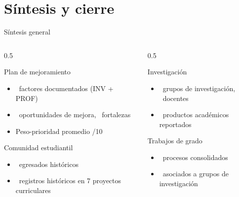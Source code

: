 \documentclass[aspectratio=169, 11pt]{beamer}
\begin{document}
\section{Síntesis y cierre}

\begin{frame}{Síntesis general}
  \begin{columns}[T]
    \begin{column}{0.5\textwidth}
      \begin{block}{Plan de mejoramiento}
        \begin{itemize}
          \small
          \item \NumFactoresTotal\ factores documentados (INV + PROF)
          \item \NumOportunidades\ oportunidades de mejora, \NumFortalezas\ fortalezas
          \item Peso-prioridad promedio \PesoPromInv/10
        \end{itemize}
      \end{block}
      \begin{block}{Comunidad estudiantil}
        \begin{itemize}
          \small
          \item \TotalEgresadosHistorico\ egresados históricos
          \item \TotalEstudiantesHistorico\ registros históricos en 7 proyectos curriculares
        \end{itemize}
      \end{block}
    \end{column}
    \begin{column}{0.5\textwidth}
      \begin{block}{Investigación}
        \begin{itemize}
          \small
          \item \NumGrupos\ grupos de investigación, \NumDocentesGrupos\ docentes
          \item \TotalProductosGrupos\ productos académicos reportados
        \end{itemize}
      \end{block}
      \begin{block}{Trabajos de grado}
        \begin{itemize}
          \small
          \item \TotalProcesosTesis\ procesos consolidados
          \item \NumProyectosConGrupo\ asociados a grupos de investigación
        \end{itemize}
      \end{block}
    \end{column}
  \end{columns}
\end{frame}
\end{document}
